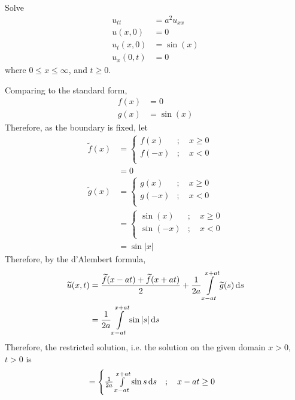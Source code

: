 \documentclass[fleqn, a4paper, 11pt, oneside]{amsart}
\theoremstyle{definition}
\theoremstyle{theorem}
\renewcommand{\tilde}{\widetilde}
\begin{document}
\begin{question}
	Solve
	\begin{align*}
		u_{t t}  & = a^2 u_{x x} \\
		u(x,0)   & = 0           \\
		u_t(x,0) & = \sin(x)     \\
		u_x(0,t) & = 0
	\end{align*}
	where $0 \le x \le \infty$, and $t \ge 0$.
\end{question}

\begin{solution}
	Comparing to the standard form,
	\begin{align*}
		f(x) & = 0 \\
		g(x) & = \sin(x)
	\end{align*}
	Therefore, as the boundary is fixed, let
	\begin{align*}
		\tilde{f}(x) &=
			\begin{cases}
				f(x)  & ;\quad x \ge 0 \\
				f(-x) & ;\quad x < 0   \\
			\end{cases}\\
		&= 0\\
		\tilde{g}(x) &=
			\begin{cases}
				g(x)  & ;\quad x \ge 0 \\
				g(-x) & ;\quad x < 0   \\
			\end{cases}\\
		&=
			\begin{cases}
				\sin(x)  & ;\quad x \ge 0 \\
				\sin(-x) & ;\quad x < 0   \\
			\end{cases}\\
		&= \sin|x|
	\end{align*}
	Therefore, by the d'Alembert formula,
	\begin{align*}
		\tilde{u}(x,t) & = \frac{\tilde{f}(x - a t) + \tilde{f}(x + a t)}{2} + \frac{1}{2 a} \int\limits_{x - a t}^{x + a t} \tilde{g}(s) \dif s \\
                               & = \frac{1}{2 a} \int\limits_{x - a t}^{x + a t} \sin|s| \dif s
	\end{align*}
	Therefore, the restricted solution, i.e. the solution on the given domain $x > 0$, $t > 0$ is
	\begin{align*}
		&=
			\begin{cases}
				\frac{1}{2 a} \int\limits_{x - a t}^{x + a t} \sin s \dif s                                       & ;\quad x - a t \ge 0 \\

\end{cases}
\end{align*}
\end{solution}
\end{document}
